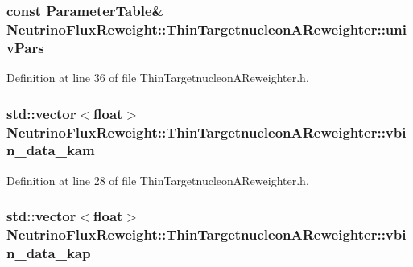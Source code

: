 \hypertarget{class_neutrino_flux_reweight_1_1_thin_targetnucleon_a_reweighter_a56d10ce15819c77e9d4a6538f403b71e}{
\subsubsection[{univ\-Pars}]{\setlength{\rightskip}{0pt plus 5cm}const {\bf Parameter\-Table}\& Neutrino\-Flux\-Reweight\-::\-Thin\-Targetnucleon\-A\-Reweighter\-::univ\-Pars\hspace{0.3cm}{\ttfamily [private]}}}\label{class_neutrino_flux_reweight_1_1_thin_targetnucleon_a_reweighter_a56d10ce15819c77e9d4a6538f403b71e}


Definition at line 36 of file Thin\-Targetnucleon\-A\-Reweighter.\-h.

\hypertarget{class_neutrino_flux_reweight_1_1_thin_targetnucleon_a_reweighter_ae434ebe9822621ab7e5250b4057a883d}{
\subsubsection[{vbin\-\_\-data\-\_\-kam}]{\setlength{\rightskip}{0pt plus 5cm}std\-::vector$<$float$>$ Neutrino\-Flux\-Reweight\-::\-Thin\-Targetnucleon\-A\-Reweighter\-::vbin\-\_\-data\-\_\-kam}}\label{class_neutrino_flux_reweight_1_1_thin_targetnucleon_a_reweighter_ae434ebe9822621ab7e5250b4057a883d}


Definition at line 28 of file Thin\-Targetnucleon\-A\-Reweighter.\-h.

\hypertarget{class_neutrino_flux_reweight_1_1_thin_targetnucleon_a_reweighter_acfadbda1695d49d43efe9e5a5395317b}{
\subsubsection[{vbin\-\_\-data\-\_\-kap}]{\setlength{\rightskip}{0pt plus 5cm}std\-::vector$<$float$>$ Neutrino\-Flux\-Reweight\-::\-Thin\-Targetnucleon\-A\-Reweighter\-::vbin\-\_\-data\-\_\-kap}}\label{class_neutrino_flux_reweight_1_1_thin_targetnucleon_a_reweighter_acfadbda1695d49d43efe9e5a5395317b}


